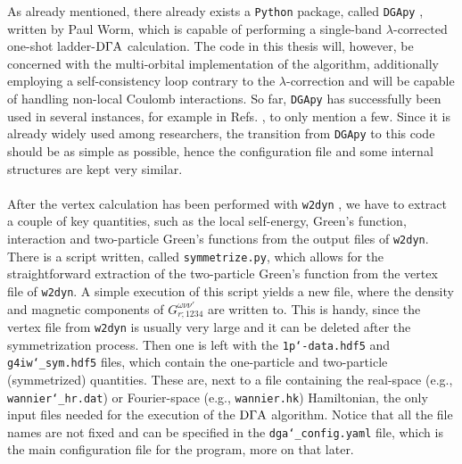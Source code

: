 \documentclass[../../main.tex]{subfiles}
\begin{document}
As already mentioned, there already exists a \texttt{Python} package, called \texttt{DGApy} \cite{dgapy}, written by Paul Worm, which is capable of performing a single-band $\lambda$-corrected one-shot ladder-$\text{D}\Gamma\text{A}$ calculation. The code in this thesis will, however, be concerned with the multi-orbital implementation of the algorithm, additionally employing a self-consistency loop contrary to the $\lambda$-correction and will be capable of handling non-local Coulomb interactions. So far, \texttt{DGApy} has successfully been used in several instances, for example in Refs. \cite{simone unconventional, paul spin fluc}, to only mention a few. Since it is already widely used among researchers, the transition from \texttt{DGApy} to this code should be as simple as possible, hence the configuration file and some internal structures are kept very similar.
\\\\
After the vertex calculation has been performed with \texttt{w2dyn} \cite{w2dyn}, we have to extract a couple of key quantities, such as the local self-energy, Green's function, interaction and two-particle Green's functions from the output files of \texttt{w2dyn}. There is a script written, called \texttt{symmetrize.py}, which allows for the straightforward extraction of the two-particle Green's function from the vertex file of \texttt{w2dyn}. A simple execution of this script yields a new file, where the density and magnetic components of $G^{\omega\nu\nu'}_{r;\mathfrak{1234}}$ are written to. This is handy, since the vertex file from \texttt{w2dyn} is usually very large and it can be deleted after the symmetrization process. Then one is left with the \texttt{1p\char`-data.hdf5} and \texttt{g4iw\char`_sym.hdf5} files, which contain the one-particle and two-particle (symmetrized) quantities. These are, next to a file containing the real-space (e.g., \texttt{wannier\char`_hr.dat}) or Fourier-space (e.g., \texttt{wannier.hk}) Hamiltonian, the only input files needed for the execution of the $\text{D}\Gamma\text{A}$ algorithm. Notice that all the file names are not fixed and can be specified in the \texttt{dga\char`_config.yaml} file, which is the main configuration file for the program, more on that later.
\\\\
\end{document}

